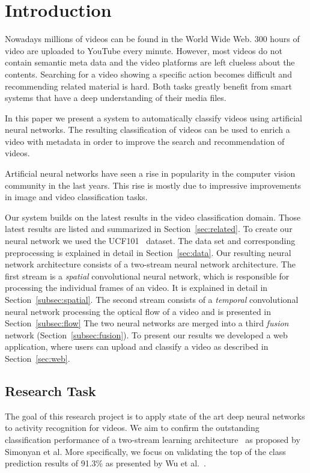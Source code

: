 \section{Introduction}
\label{sec:introduction}

Nowadays millions of videos can be found in the World Wide Web.
300 hours of video are uploaded to YouTube every minute.
However, most videos do not contain semantic meta data and the video platforms are left clueless about the contents.
Searching for a video showing a specific action becomes difficult and recommending related material is hard.
Both tasks greatly benefit from smart systems that have a deep understanding of their media files.

In this paper we present a system to automatically classify videos using artificial neural networks.
The resulting classification of videos can be used to enrich a video with metadata in order to improve the search and recommendation of videos.

Artificial neural networks have seen a rise in popularity in the computer vision community in the last years.
This rise is mostly due to impressive improvements in image and video classification tasks.

Our system builds on the latest results in the video classification domain.
Those latest results are listed and summarized in Section~\ref{sec:related}.
To create our neural network we used the UCF101~\cite{soomro2012ucf101} dataset.
The data set and corresponding preprocessing is explained in detail in Section~\ref{sec:data}.
Our resulting neural network architecture consists of a two-stream neural network architecture.
The first stream is a \emph{spatial} convolutional neural network, which is responsible for processing the individual frames of an video.
It is explained in detail in Section~\ref{subsec:spatial}.
The second stream consists of a \emph{temporal} convolutional neural network processing the optical flow of a video and is presented in Section~\ref{subsec:flow}
The two neural networks are merged into a third \emph{fusion} network (Section~\ref{subsec:fusion}).
To present our results we developed a web application, where users can upload and classify a video as described in Section~\ref{sec:web}.

\subsection*{Research Task}
The goal of this research project is to apply state of the art deep neural networks to activity recognition for videos.
We aim to confirm the outstanding classification performance of a two-stream learning architecture~\cite{simonyan2014two} as proposed by Simonyan et al.
More specifically, we focus on validating the top of the class prediction results of 91.3\% as presented by Wu et al.~\cite{wu2015modeling}.